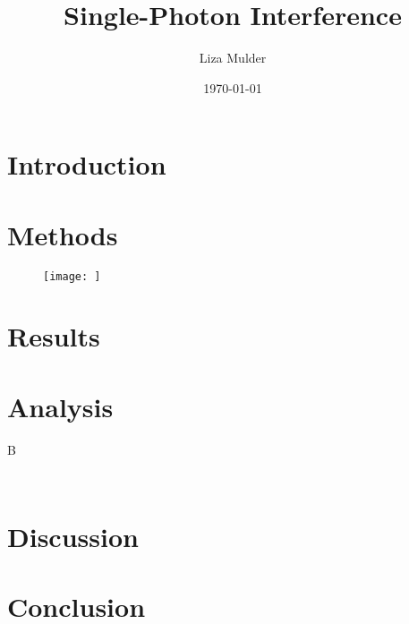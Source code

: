 \documentclass[prb,preprint]{revtex4-1}
\begin{document}

\title{Single-Photon Interference}


\author{Liza Mulder}


\author{}
\email{}


\date{\today}



\begin{abstract}

\end{abstract}

\maketitle %


\section{Introduction} %



\section{Methods}


\begin{figure}[h!]
\centering
\texttt{[image: ]}
\caption{ }
\label{}
\end{figure}

\section{Results}

\section{Analysis}

B
\begin{table}[h!]
\centering
\caption{ }
\begin{ruledtabular}
\begin{tabular}{lc}
     
\end{tabular}
\end{ruledtabular}
\label{parameters}
\end{table}


\section{Discussion}


\section{Conclusion}

\begin{thebibliography}{3}

\end{thebibliography}
\end{document}
